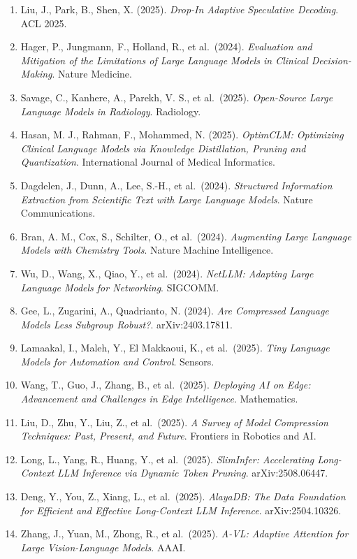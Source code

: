 \begin{enumerate}
\item
  Liu, J., Park, B., Shen, X. (2025). \emph{Drop-In Adaptive Speculative Decoding}. ACL 2025.
\item
  Hager, P., Jungmann, F., Holland, R., et al.~(2024). \emph{Evaluation and Mitigation of the Limitations of Large Language Models in Clinical Decision-Making}. Nature Medicine.
\item
  Savage, C., Kanhere, A., Parekh, V. S., et al.~(2025). \emph{Open-Source Large Language Models in Radiology}. Radiology.
\item
  Hasan, M. J., Rahman, F., Mohammed, N. (2025). \emph{OptimCLM: Optimizing Clinical Language Models via Knowledge Distillation, Pruning and Quantization}. International Journal of Medical Informatics.
\item
  Dagdelen, J., Dunn, A., Lee, S.-H., et al.~(2024). \emph{Structured Information Extraction from Scientific Text with Large Language Models}. Nature Communications.
\item
  Bran, A. M., Cox, S., Schilter, O., et al.~(2024). \emph{Augmenting Large Language Models with Chemistry Tools}. Nature Machine Intelligence.
\item
  Wu, D., Wang, X., Qiao, Y., et al.~(2024). \emph{NetLLM: Adapting Large Language Models for Networking}. SIGCOMM.
\item
  Gee, L., Zugarini, A., Quadrianto, N. (2024). \emph{Are Compressed Language Models Less Subgroup Robust?}. arXiv:2403.17811.
\item
  Lamaakal, I., Maleh, Y., El Makkaoui, K., et al.~(2025). \emph{Tiny Language Models for Automation and Control}. Sensors.
\item
  Wang, T., Guo, J., Zhang, B., et al.~(2025). \emph{Deploying AI on Edge: Advancement and Challenges in Edge Intelligence}. Mathematics.
\item
  Liu, D., Zhu, Y., Liu, Z., et al.~(2025). \emph{A Survey of Model Compression Techniques: Past, Present, and Future}. Frontiers in Robotics and AI.
\item
  Long, L., Yang, R., Huang, Y., et al.~(2025). \emph{SlimInfer: Accelerating Long-Context LLM Inference via Dynamic Token Pruning}. arXiv:2508.06447.
\item
  Deng, Y., You, Z., Xiang, L., et al.~(2025). \emph{AlayaDB: The Data Foundation for Efficient and Effective Long-Context LLM Inference}. arXiv:2504.10326.
\item
  Zhang, J., Yuan, M., Zhong, R., et al.~(2025). \emph{A-VL: Adaptive Attention for Large Vision-Language Models}. AAAI.

\end{enumerate}
